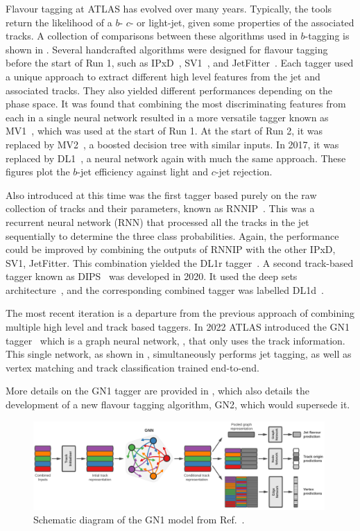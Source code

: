 Flavour tagging at ATLAS has evolved over many years.
Typically, the tools return the likelihood of a $b$- $c$- or light-jet, given some properties of the associated tracks.
A collection of comparisons between these algorithms used in $b$-tagging is shown in .
Several handcrafted algorithms were designed for flavour tagging before the start of Run 1, such as IPxD~\cite{IPxD}, SV1~\cite{SV1}, and JetFitter~\cite{JetFitter}.
Each tagger used a unique approach to extract different high level features from the jet and associated tracks.
They also yielded different performances depending on the phase space.
It was found that combining the most discriminating features from each in a single neural network resulted in a more versatile tagger known as MV1~\cite{MV1}, which was used at the start of Run 1.
At the start of Run 2, it was replaced by MV2~\cite{MV2}, a boosted decision tree with similar inputs.
In 2017, it was replaced by DL1~\cite{DL1}, a neural network again with much the same approach.
These figures plot the $b$-jet efficiency against light and $c$-jet rejection.

Also introduced at this time was the first tagger based purely on the raw collection of tracks and their parameters, known as RNNIP~\cite{RNNIP}.
This was a recurrent neural network (RNN) that processed all the tracks in the jet sequentially to determine the three class probabilities.
Again, the performance could be improved by combining the outputs of RNNIP with the other IPxD, SV1, JetFitter.
This combination yielded the DL1r tagger~\cite{Run2FTAlgs}.
A second track-based tagger known as DIPS~\cite{DIPS} was developed in 2020.
It used the deep sets architecture~\cite{DeepSets}, and the corresponding combined tagger was labelled DL1d~\cite{AlexThesis}.

The most recent iteration is a departure from the previous approach of combining multiple high level and track based taggers.
In 2022 ATLAS introduced the GN1 tagger~\cite{GN1} which is a graph neural network, , that only uses the track information.
This single network, as shown in , simultaneously performs jet tagging, as well as vertex matching and track classification trained end-to-end.

More details on the GN1 tagger are provided in , which also details the development of a new flavour tagging algorithm, GN2, which would supersede it.

\begin{figure}[h]
    \centering
    \includegraphics[width=0.99\textwidth]{Figures/cern_atlas/GN1.png}
    \caption{Schematic diagram of the GN1 model from Ref.~\cite{GN1}.}
    \label{fig:gn1}
\end{figure}


